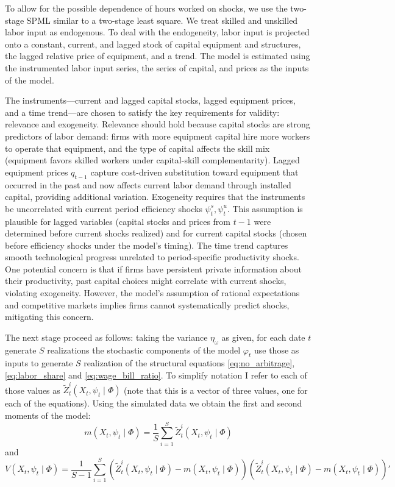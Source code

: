 \documentclass[12pt]{article}
\begin{document}
To allow for the possible dependence of hours worked on shocks, we use the two-stage SPML similar to a two-stage least square. We treat skilled and unskilled labor input as endogenous. To deal with the endogeneity, labor input is projected onto a constant, current, and lagged stock of capital equipment and structures, the lagged relative price of equipment, and a trend. The model is estimated using the instrumented labor input series, the series of capital, and prices as the inputs of the model.

The instruments---current and lagged capital stocks, lagged equipment prices, and a time trend---are chosen to satisfy the key requirements for validity: relevance and exogeneity. Relevance should hold because capital stocks are strong predictors of labor demand: firms with more equipment capital hire more workers to operate that equipment, and the type of capital affects the skill mix (equipment favors skilled workers under capital-skill complementarity). Lagged equipment prices $q_{t-1}$ capture cost-driven substitution toward equipment that occurred in the past and now affects current labor demand through installed capital, providing additional variation. Exogeneity requires that the instruments be uncorrelated with current period efficiency shocks $\psi^s_t, \psi^u_t$. This assumption is plausible for lagged variables (capital stocks and prices from $t-1$ were determined before current shocks realized) and for current capital stocks (chosen before efficiency shocks under the model's timing). The time trend captures smooth technological progress unrelated to period-specific productivity shocks. One potential concern is that if firms have persistent private information about their productivity, past capital choices might correlate with current shocks, violating exogeneity. However, the model's assumption of rational expectations and competitive markets implies firms cannot systematically predict shocks, mitigating this concern.

The next stage proceed as follows: taking the variance $\eta_\omega$ as given, for each date $t$ generate $S$ realizations the stochastic components of the model $\varphi_t$ use those as inputs to generate $S$ realization of the structural equations \eqref{eq:no_arbitrage}, \eqref{eq:labor_share} and \eqref{eq:wage_bill_ratio}. To simplify notation I refer to each of those values as $\tilde{Z}^{i}_t(X_{t}, \psi_{t} \mid \Phi)$ (note that this is a vector of three values, one for each of the equations). Using the simulated data we obtain the first and second moments of the model: 
\begin{equation}\label{eq:first_moment}
 m(X_{t}, \psi_{t} \mid \Phi) = \frac{1}{S}\sum_{i=1}^S \tilde{Z}^{i}_t(X_{t}, \psi_{t} \mid \Phi)
\end{equation}
and
\begin{equation}\label{eq:second_moment}
 V(X_{t}, \psi_{t} \mid \Phi) = \frac{1}{S-1}\sum_{i=1}^S \left( \tilde{Z}^{i}_t(X_{t}, \psi_{t} \mid \Phi) - m(X_{t}, \psi_{t} \mid \Phi) \right) \left( \tilde{Z}^{i}_t(X_{t}, \psi_{t} \mid \Phi) - m(X_{t}, \psi_{t} \mid \Phi) \right)'
\end{equation}
\end{document}

